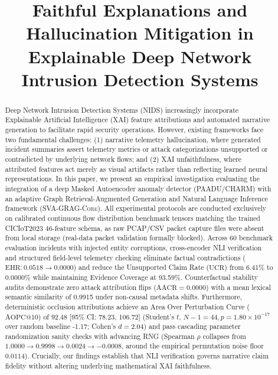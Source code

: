 \documentclass[conference]{IEEEtran}
\begin{document}
\title{Faithful Explanations and Hallucination Mitigation in Explainable Deep Network Intrusion Detection Systems}

\author{
}

\maketitle

\begin{abstract}
Deep Network Intrusion Detection Systems (NIDS) increasingly incorporate Explainable Artificial Intelligence (XAI) feature attributions and automated narrative generation to facilitate rapid security operations. However, existing frameworks face two fundamental challenges: (1) narrative telemetry hallucination, where generated incident summaries assert telemetry metrics or attack categorizations unsupported or contradicted by underlying network flows; and (2) XAI unfaithfulness, where attributed features act merely as visual artifacts rather than reflecting learned neural representations. In this paper, we present an empirical investigation evaluating the integration of a deep Masked Autoencoder anomaly detector (\textsc{PAADU/CHARM}) with an adaptive Graph Retrieval-Augmented Generation and Natural Language Inference framework (\textsc{SVA-GRAG-Core}). All experimental protocols are conducted exclusively on calibrated continuous flow distribution benchmark tensors matching the trained CICIoT2023 46-feature schema, as raw PCAP/CSV packet capture files were absent from local storage (real-data packet validation formally blocked). Across 60 benchmark evaluation incidents with injected entity corruptions, cross-encoder NLI verification and structured field-level telemetry checking eliminate factual contradictions ($\text{EHR}: 0.0518 \to 0.0000$) and reduce the Unsupported Claim Rate ($\text{UCR}$) from 6.41\% to 0.0000\% while maintaining Evidence Coverage at 93.59\%. Counterfactual stability audits demonstrate zero attack attribution flips ($\text{AACR} = 0.0000$) with a mean lexical semantic similarity of 0.9915 under non-causal metadata shifts. Furthermore, deterministic occlusion attributions achieve an Area Over Perturbation Curve ($\text{AOPC@10}$) of 92.48 [95\% CI: 78.23, 106.72] (Student's $t$, $N-1=44, p = 1.80 \times 10^{-17}$ over random baseline -1.17; Cohen's $d = 2.04$) and pass cascading parameter randomization sanity checks with advancing RNG (Spearman $\rho$ collapses from $1.0000 \to 0.9998 \to 0.0024 \to -0.0008$, around the empirical permutation noise floor $0.0114$). Crucially, our findings establish that NLI verification governs narrative claim fidelity without altering underlying mathematical XAI faithfulness.
\end{abstract}
\end{document}

